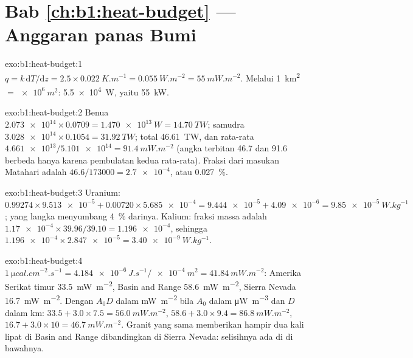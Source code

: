 \section*{Bab \ref{ch:b1:heat-budget} --- Anggaran panas Bumi}

\begin{solution}{exo:b1:heat-budget:1}
$q = k\,\mathrm dT/\mathrm dz = 2.5\times\qty{0.022}{K.m^{-1}} =
\qty{0.055}{W.m^{-2}} = \qty{55}{mW.m^{-2}}$. Melalui \qty{1}{km^2} $=
\qty{e6}{m^2}$: \qty{5.5e4}{W}, yaitu \qty{55}{kW}.
\end{solution}

\begin{solution}{exo:b1:heat-budget:2}
Benua $\num{2.073e14}\times0.0709 = \qty{1.470e13}{W} = \qty{14.70}{TW}$;
samudra $\num{3.028e14}\times0.1054 = \qty{31.92}{TW}$; total \qty{46.61}{TW}, dan
 rata-rata $\num{4.661e13}/\num{5.101e14} = \qty{91.4}{mW.m^{-2}}$ (angka
terbitan 46.7 dan 91.6 berbeda hanya karena pembulatan kedua rata-rata). Fraksi
dari masukan Matahari adalah $46.6/173000 = \num{2.7e-4}$, atau
\qty{0.027}{\percent}.
\end{solution}

\begin{solution}{exo:b1:heat-budget:3}
Uranium: $0.99274\times\num{9.513e-5} + 0.00720\times\num{5.685e-4} =
\num{9.444e-5} + \num{4.09e-6} = \qty{9.85e-5}{W.kg^{-1}}$;  yang langka
menyumbang \qty{4}{\percent} darinya. Kalium: fraksi massa
 adalah $\num{1.17e-4}\times39.96/39.10 = \num{1.196e-4}$, sehingga
$\num{1.196e-4}\times\num{2.847e-5} = \qty{3.40e-9}{W.kg^{-1}}$.
\end{solution}

\begin{solution}{exo:b1:heat-budget:4}
$\qty{1}{\micro cal.cm^{-2}.s^{-1}} = \num{4.184e-6}\,\unit{J.s^{-1}}/\qty{e-4}{m^2}
= \qty{41.84}{mW.m^{-2}}$: Amerika Serikat timur \qty{33.5}{mW.m^{-2}}, Basin and
Range \qty{58.6}{mW.m^{-2}}, Sierra Nevada \qty{16.7}{mW.m^{-2}}. Dengan $A_0D$ dalam
\unit{mW.m^{-2}} bila $A_0$ dalam \unit{\micro W.m^{-3}} dan $D$ dalam \unit{km}:
$33.5 + 3.0\times7.5 = \qty{56.0}{mW.m^{-2}}$, $58.6 + 3.0\times9.4 =
\qty{86.8}{mW.m^{-2}}$, $16.7 + 3.0\times10 = \qty{46.7}{mW.m^{-2}}$. Granit yang sama
memberikan  hampir dua kali lipat di Basin and Range dibandingkan di
Sierra Nevada: selisihnya ada di  di bawahnya.
\end{solution}

